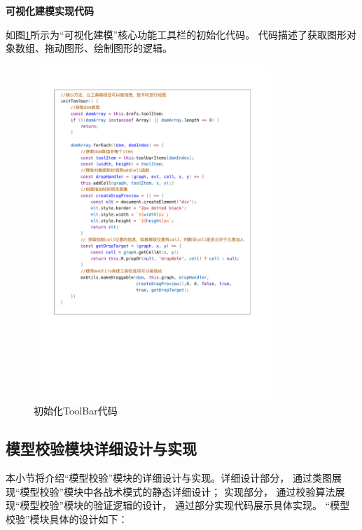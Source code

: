\newpage
\textbf{可视化建模实现代码}

如图\ref{initToolbar}所示为“可视化建模”核心功能工具栏的初始化代码。
代码描述了获取图形对象数组、拖动图形、绘制图形的逻辑。

\begin{figure}[!htbp] %
    \centering %
    \includegraphics[width=0.8\textwidth]{FIGs/chapter4/initToolbar.pdf} %
    \caption{初始化ToolBar代码} %
    \label{initToolbar} %
\end{figure}%

\subsection{模型校验模块详细设计与实现}

本小节将介绍“模型校验”模块的详细设计与实现。详细设计部分，
通过类图展现“模型校验”模块中各战术模式的静态详细设计；
实现部分，
通过校验算法展现“模型校验”模块的验证逻辑的设计，
通过部分实现代码展示具体实现。
“模型校验”模块具体的设计如下：

